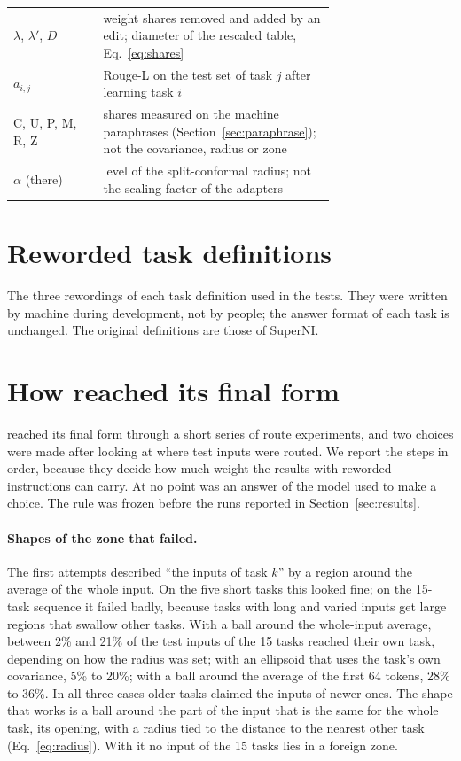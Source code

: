 \begin{table}[H]
\begin{tabular}{lp{0.72\linewidth}}
    $\lambda$, $\lambda'$, $D$ & weight shares removed and added by an edit; diameter of the rescaled table, Eq.~\eqref{eq:shares} \\
        $a_{i,j}$ & Rouge-L on the test set of task $j$ after learning task $i$ \\
    \textsf{C}, \textsf{U}, \textsf{P}, \textsf{M}, \textsf{R}, \textsf{Z} & shares measured on the machine paraphrases (Section~\ref{sec:paraphrase}); not the covariance, radius or zone \\
    $\alpha$ (there) & level of the split-conformal radius; not the scaling factor of the adapters \\
    \bottomrule
  \end{tabular}
\end{table}

\FloatBarrier
\section{Reworded task definitions}
\label{app:rewordings}

The three rewordings of each task definition used in the tests. They were written by machine during development, not by people; the answer format of each task is unchanged. The original
definitions are those of SuperNI.



\FloatBarrier
\section{How \cert{} reached its final form}
\label{app:history}

\cert{} reached its final form through a short series of route experiments, and two choices were made after
looking at where test inputs were routed. We report the steps in order, because they decide how
much weight the results with reworded instructions can carry. At no point was an answer of the
model used to make a choice. The rule was frozen before the runs reported in
Section~\ref{sec:results}.

\paragraph{Shapes of the zone that failed.} The first attempts described ``the inputs of task $k$''
by a region around the average of the whole input. On the five short tasks this looked fine; on the
15-task sequence it failed badly, because tasks with long and varied inputs get large regions that
swallow other tasks. With a ball around the whole-input average, between 2\% and 21\% of the test
inputs of the 15 tasks reached their own task, depending on how the radius was set; with an
ellipsoid that uses the task's own covariance, 5\% to 20\%; with a ball around the average of the
first 64 tokens, 28\% to 36\%. In all three cases older tasks claimed the inputs of newer ones. The
shape that works is a ball around the part of the input that is the same for the whole task, its
opening, with a radius tied to the distance to the nearest other task (Eq.~\ref{eq:radius}). With it
no input of the 15 tasks lies in a foreign zone.

